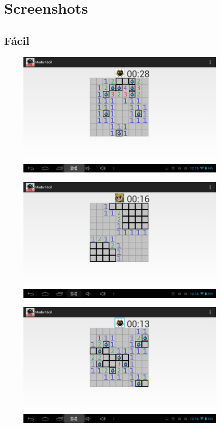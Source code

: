 \documentclass[12pt]{article}
\begin{document}
\section{Screenshots}

\subsection{Fácil}

\begin{minipage}{0.1\textwidth}
\includegraphics[height=6cm,width=12cm]{facil} 
\end{minipage}

\begin{minipage}{0.1\textwidth}
\includegraphics[height=6cm,width=12cm]{facil2} 
\end{minipage}

\begin{minipage}{0.1\textwidth}
\includegraphics[height=6cm,width=12cm]{facil3} 
\end{minipage}
\end{document}
